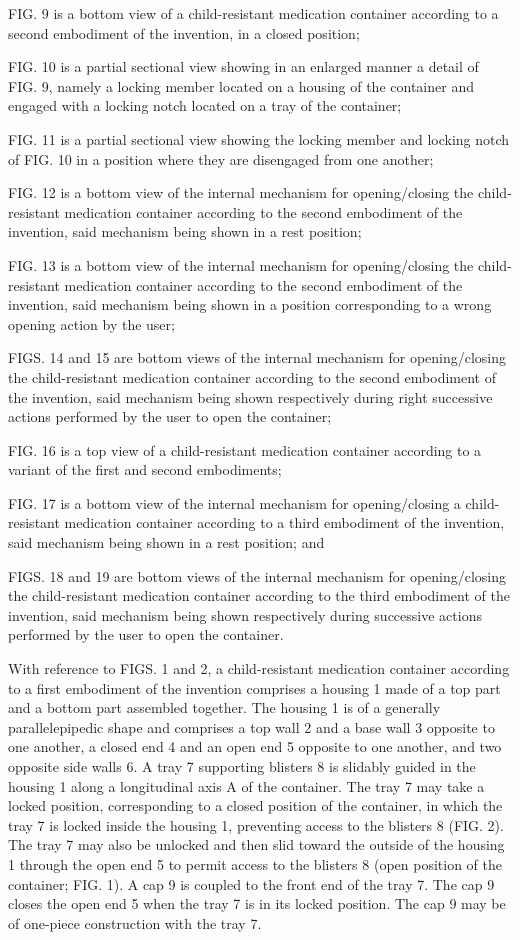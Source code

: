 \documentclass[11pt,a4paper]{article}
\begin{document}
FIG. 9 is a bottom view of a child-resistant medication container according to a second embodiment of the invention, in a closed position;

FIG. 10 is a partial sectional view showing in an enlarged manner a detail of FIG. 9, namely a locking member located on a housing of the container and engaged with a locking notch located on a tray of the container;

FIG. 11 is a partial sectional view showing the locking member and locking notch of FIG. 10 in a position where they are disengaged from one another;

FIG. 12 is a bottom view of the internal mechanism for opening/closing the child-resistant medication container according to the second embodiment of the invention, said mechanism being shown in a rest position;

FIG. 13 is a bottom view of the internal mechanism for opening/closing the child-resistant medication container according to the second embodiment of the invention, said mechanism being shown in a position corresponding to a wrong opening action by the user;

FIGS. 14 and 15 are bottom views of the internal mechanism for opening/closing the child-resistant medication container according to the second embodiment of the invention, said mechanism being shown respectively during right successive actions performed by the user to open the container;

FIG. 16 is a top view of a child-resistant medication container according to a variant of the first and second embodiments;

FIG. 17 is a bottom view of the internal mechanism for opening/closing a child-resistant medication container according to a third embodiment of the invention, said mechanism being shown in a rest position; and

FIGS. 18 and 19 are bottom views of the internal mechanism for opening/closing the child-resistant medication container according to the third embodiment of the invention, said mechanism being shown respectively during successive actions performed by the user to open the container.

With reference to FIGS. 1 and 2, a child-resistant medication container according to a first embodiment of the invention comprises a housing 1 made of a top part and a bottom part assembled together. The housing 1 is of a generally parallelepipedic shape and comprises a top wall 2 and a base wall 3 opposite to one another, a closed end 4 and an open end 5 opposite to one another, and two opposite side walls 6. A tray 7 supporting blisters 8 is slidably guided in the housing 1 along a longitudinal axis A of the container. The tray 7 may take a locked position, corresponding to a closed position of the container, in which the tray 7 is locked inside the housing 1, preventing access to the blisters 8 (FIG. 2). The tray 7 may also be unlocked and then slid toward the outside of the housing 1 through the open end 5 to permit access to the blisters 8 (open position of the container; FIG. 1). A cap 9 is coupled to the front end of the tray 7. The cap 9 closes the open end 5 when the tray 7 is in its locked position. The cap 9 may be of one-piece construction with the tray 7.
\end{document}

